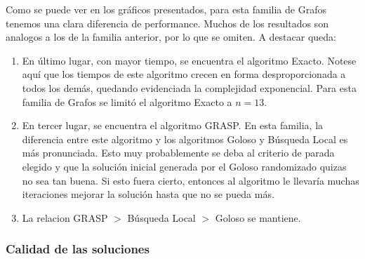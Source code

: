 Como se puede ver en los gráficos presentados, para esta familia de Grafos tenemos una clara diferencia de performance. Muchos de los resultados son analogos a los de la familia anterior, por lo que se omiten. A destacar queda:
\begin{enumerate}
    \item En último lugar, con mayor tiempo, se encuentra el algoritmo Exacto. Notese aquí que los tiempos de este algoritmo crecen en forma desproporcionada a todos los demás, quedando evidenciada la complejidad exponencial. Para esta familia de Grafos se limitó el algoritmo Exacto a $n=13$.
    \item En tercer lugar, se encuentra el algoritmo GRASP. En esta familia, la diferencia entre este algoritmo y los algoritmos Goloso y Búsqueda Local es más pronunciada. Esto muy probablemente se deba al criterio de parada elegido y que la solución inicial generada por el Goloso randomizado quizas no sea tan buena. Si esto fuera cierto, entonces al algoritmo le llevaría muchas iteraciones mejorar la solución hasta que no se pueda más.
    \item La relacion GRASP $>$ Búsqueda Local $>$ Goloso se mantiene.
\end{enumerate}

\subsubsection{Calidad de las soluciones}
\begin{center}
\end{center}

